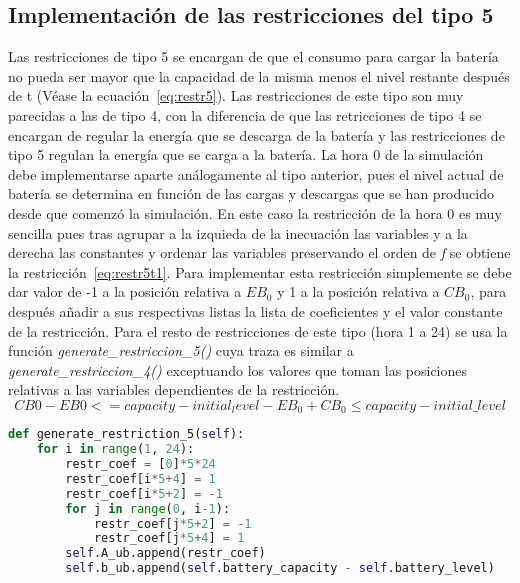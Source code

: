 \subsection{Implementación de las restricciones del tipo 5}
Las restricciones de tipo 5 se encargan de que el consumo para cargar la batería no pueda ser mayor que la capacidad de la misma menos el nivel restante después de t (Véase la ecuación~\ref{eq:restr5}). Las restricciones de este tipo son muy parecidas a las de tipo 4, con la diferencia de que las retricciones de tipo 4 se encargan de regular la energía que se descarga de la batería y las restricciones de tipo 5 regulan la energía que se carga a la batería. La hora 0 de la simulación debe implementarse aparte análogamente al tipo anterior, pues el nivel actual de batería se determina en función de las cargas y descargas que se han producido desde que comenzó la simulación. En este caso la restricción de la hora 0 es muy sencilla pues tras agrupar a la izquieda de la inecuación las variables y a la derecha las constantes y ordenar las variables preservando el orden de \textit{f} se obtiene la restricción~\ref{eq:restr5t1}. Para implementar esta restricción simplemente se debe dar valor de -1 a la posición relativa a $ EB_{0} $ y 1 a la posición relativa a $ CB_{0} $, para después añadir a sus respectivas listas la lista de coeficientes y el valor constante de la restricción. Para el resto de restricciones de este tipo (hora 1 a 24) se usa la función \textit{generate\_restriccion\_5()} cuya traza es similar a \textit{generate\_restriccion\_4()} exceptuando los valores que toman las posiciones relativas a las variables dependientes de la restricción.
\begin{equation}
  \label{eq:restr5t1}
  CB0 - EB0 <= capacity - initial_level
  -EB_{0} + CB_{0} \leq capacity - initial\_level
\end{equation}
\begin{lstlisting}[language=Python,float=ht,caption={Restricciones del tipo 5},label={lst:restr5}]
def generate_restriction_5(self):
    for i in range(1, 24):
        restr_coef = [0]*5*24
        restr_coef[i*5+4] = 1
        restr_coef[i*5+2] = -1
        for j in range(0, i-1):
            restr_coef[j*5+2] = -1
            restr_coef[j*5+4] = 1
        self.A_ub.append(restr_coef)
        self.b_ub.append(self.battery_capacity - self.battery_level)
\end{lstlisting}
